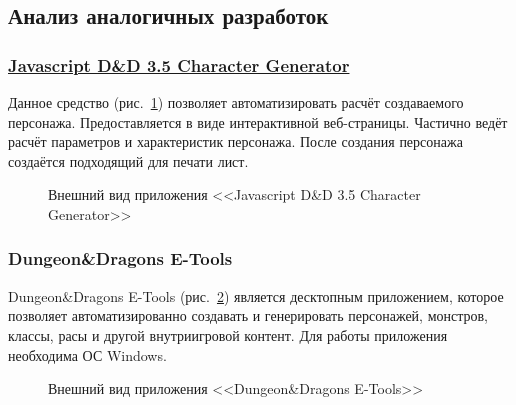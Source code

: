 \subsection{Анализ аналогичных разработок}


\subsubsection{\href{http://www.pathguy.com/cg35.htm}{Javascript D\&D 3.5 Character Generator}}
Данное средство (рис.~\ref{ris:js_character_generator}) позволяет автоматизировать расчёт создаваемого персонажа. Предоставляется в виде интерактивной веб-страницы. Частично ведёт расчёт параметров и характеристик персонажа. После создания персонажа создаётся подходящий для печати лист.

\begin{figure}[h]
\caption{Внешний вид приложения <<Javascript D\&D 3.5 Character Generator>>}
\label{ris:js_character_generator}
\end{figure}


\subsubsection{Dungeon\&Dragons E-Tools}
Dungeon\&Dragons E-Tools (рис.~\ref{ris:dnd_e-tools}) является десктопным приложением, которое позволяет автоматизированно создавать и генерировать персонажей, монстров, классы, расы и другой внутриигровой контент. Для работы приложения необходима ОС Windows.

\begin{figure}[h]
\caption{Внешний вид приложения <<Dungeon\&Dragons E-Tools>>}
\label{ris:dnd_e-tools}
\end{figure}



